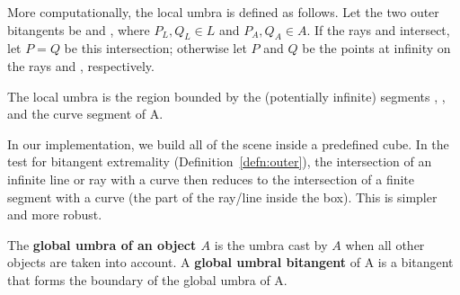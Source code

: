 \documentclass[9pt,twocolumn]{article}
\begin{document}

\begin{rmk}
More computationally, the local umbra is defined as follows.
Let the two outer bitangents be  and ,
where $P_L,Q_L \in L$ and $P_A,Q_A \in A$.
If the rays  and  intersect,
let $P=Q$ be this intersection;
otherwise let $P$ and $Q$ be the points 
at infinity on the rays  and , respectively.

The local umbra is the region bounded by the (potentially infinite)
segments , ,
and the curve segment  of A.
\end{rmk}

\begin{implementation}
In our implementation, we build all of the scene inside a predefined cube.
In the test for bitangent extremality (Definition~\ref{defn:outer}),
the intersection of an infinite line or ray
with a curve then reduces to the intersection of a finite segment with a curve
(the part of the ray/line inside the box).
This is simpler and more robust.
\end{implementation}




\begin{defn2}
\label{defn:global}
The {\bf global umbra of an object $A$} is the umbra cast by $A$
when all other objects are taken into account.
A {\bf global umbral bitangent} of A is a bitangent 
that forms the boundary of the global umbra of A.
\end{defn2}
\end{document}
